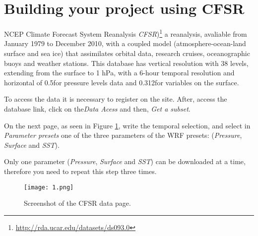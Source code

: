 \section{Building your project using CFSR}
\bigskip

\noindent NCEP Climate Forecast System Reanalysis 
\textcolor{bleu_cite}{\textit{CFSR})\footnote{\textcolor{bleu_cite}{\href{http://rda.ucar.edu/datasets/ds093.0}{http://rda.ucar.edu/datasets/ds093.0}}}}
a reanalysis, avaliable from January 1979 to December 2010, with a coupled model (atmosphere-ocean-land surface and sea ice) that
assimilates orbital data, research cruises, oceanographic buoys and weather stations. This database
has vertical resolution with 38 levels, extending from the surface to 1 hPa, with a 6-hour temporal resolution
and horizontal of 0.5\degree for pressure levels data and 0.312\degree for variables on the surface.
\bigskip

\noindent To access the data it is necessary to register on the site. After, access the database link,
click on the\textit{Data Acess} and then, \textit{Get a subset}.
\bigskip

\noindent On the next page, as seen in Figure \textcolor{bleu_cite}{\ref{detalhacfsr}}, write the temporal selection,
and select in \textit {Parameter presets} one of the three parameters of the WRF presets: (\textit{Pressure},
\textit{Surface} and \textit{SST}). 
\bigskip

\begin{tcolorbox}[enhanced,
    grow to left by=0cm,%
    grow to right by=0cm,%
    enlarge top by=0cm,%
    enlarge bottom by=0cm,%
    tcbox raise base,
    boxrule=1.0pt,
    left=18mm,
    colframe=red!50!black,coltext=red!25!black,colback=red!10!white,
    overlay={\begin{tcbclipinterior}\fill[red!75!blue!50!white] (frame.south west)
      rectangle node[text=white,font=\sffamily\bfseries\footnotesize,rotate=0] {WARNING} ([xshift=18mm]frame.north west);\end{tcbclipinterior}}]
      Only one parameter (\textit{Pressure}, \textit{Surface} and \textit{SST}) can be downloaded at a time, therefore you need to repeat this step three times.
\end{tcolorbox}
\bigskip

\begin{figure}[H]
    \centering
    \texttt{[image: 1.png]}
    \caption{Screenshot of the CFSR data page.}
    \label{detalhacfsr}
\end{figure}
\bigskip


